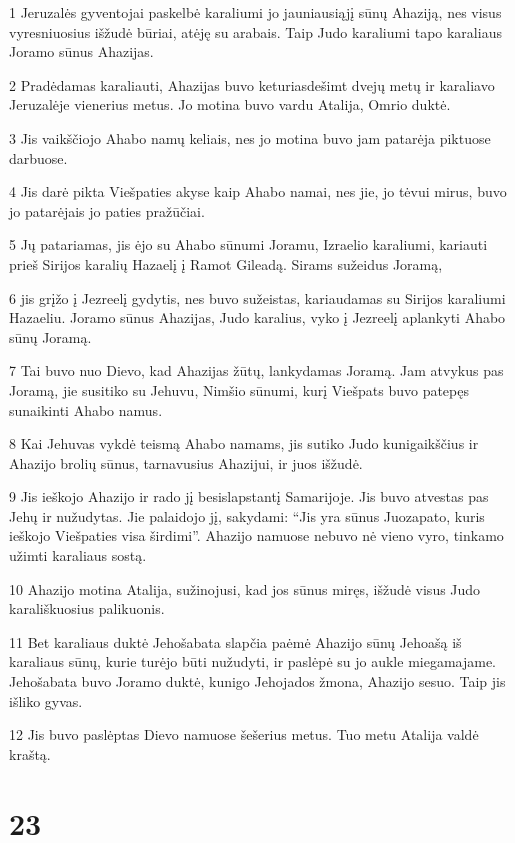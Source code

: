 \par 1 Jeruzalės gyventojai paskelbė karaliumi jo jauniausiąjį sūnų Ahaziją, nes visus vyresniuosius išžudė būriai, atėję su arabais. Taip Judo karaliumi tapo karaliaus Joramo sūnus Ahazijas. 
\par 2 Pradėdamas karaliauti, Ahazijas buvo keturiasdešimt dvejų metų ir karaliavo Jeruzalėje vienerius metus. Jo motina buvo vardu Atalija, Omrio duktė. 
\par 3 Jis vaikščiojo Ahabo namų keliais, nes jo motina buvo jam patarėja piktuose darbuose. 
\par 4 Jis darė pikta Viešpaties akyse kaip Ahabo namai, nes jie, jo tėvui mirus, buvo jo patarėjais jo paties pražūčiai. 
\par 5 Jų patariamas, jis ėjo su Ahabo sūnumi Joramu, Izraelio karaliumi, kariauti prieš Sirijos karalių Hazaelį į Ramot Gileadą. Sirams sužeidus Joramą, 
\par 6 jis grįžo į Jezreelį gydytis, nes buvo sužeistas, kariaudamas su Sirijos karaliumi Hazaeliu. Joramo sūnus Ahazijas, Judo karalius, vyko į Jezreelį aplankyti Ahabo sūnų Joramą. 
\par 7 Tai buvo nuo Dievo, kad Ahazijas žūtų, lankydamas Joramą. Jam atvykus pas Joramą, jie susitiko su Jehuvu, Nimšio sūnumi, kurį Viešpats buvo patepęs sunaikinti Ahabo namus. 
\par 8 Kai Jehuvas vykdė teismą Ahabo namams, jis sutiko Judo kunigaikščius ir Ahazijo brolių sūnus, tarnavusius Ahazijui, ir juos išžudė. 
\par 9 Jis ieškojo Ahazijo ir rado jį besislapstantį Samarijoje. Jis buvo atvestas pas Jehų ir nužudytas. Jie palaidojo jį, sakydami: “Jis yra sūnus Juozapato, kuris ieškojo Viešpaties visa širdimi”. Ahazijo namuose nebuvo nė vieno vyro, tinkamo užimti karaliaus sostą. 
\par 10 Ahazijo motina Atalija, sužinojusi, kad jos sūnus miręs, išžudė visus Judo karališkuosius palikuonis. 
\par 11 Bet karaliaus duktė Jehošabata slapčia paėmė Ahazijo sūnų Jehoašą iš karaliaus sūnų, kurie turėjo būti nužudyti, ir paslėpė su jo aukle miegamajame. Jehošabata buvo Joramo duktė, kunigo Jehojados žmona, Ahazijo sesuo. Taip jis išliko gyvas. 
\par 12 Jis buvo paslėptas Dievo namuose šešerius metus. Tuo metu Atalija valdė kraštą.



\chapter{23}

